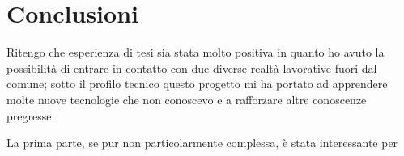 \chapter{Conclusioni}
Ritengo che esperienza di tesi sia stata molto positiva in quanto ho avuto la possibilità di entrare in contatto con due diverse realtà lavorative fuori dal comune; 
sotto il profilo tecnico questo progetto mi ha portato ad apprendere molte nuove tecnologie che non conoscevo e a rafforzare altre conoscenze pregresse.

La prima parte, se pur non particolarmente complessa, è stata interessante per 